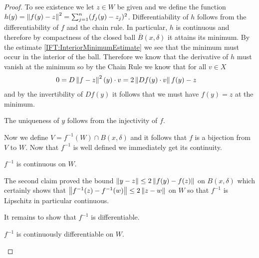 \begin{proof}
To see existence we let $z \in W$ be given and we define the function
$h(y) = \left \lVert f(y) - z \right \rVert^2 = \sum_{j=1}^n (f_j(y) - z_j)^2$.  Differentiability of $h$ follows from the
differentiability of $f$ and the chain rule.  In
particular, $h$ is continuous and therefore by compactness of the
closed ball $\overline{B}(x, \delta)$ it attains its minimum.  By the
estimate \eqref{IFT:InteriorMinimumEstimate} we see that the minimum
must occur in the interior of the ball.  Therefore we know that the
derivative of $h$ must vanish at the minimum so by the Chain Rule we
know that for all $v \in X$
\begin{align*}
0 &=D \left \lVert f - z \right \rVert^2 (y) \cdot v = 2 \left \lVert Df(y)\cdot v \right \rVert{f(y) - z}
\end{align*}
and by the invertibility of $Df(y)$ it follows that we must have $f(y)
= z$ at the minimum.

The uniqueness of $y$ follows from the injectivity of $f$.

Now we define $V = f^{-1}(W) \cap B(x, \delta)$ and it follows that
$f$ is a bijection from $V$ to $W$. Now that $f^{-1}$ is well defined
we immediately get its continuity.  

\begin{clm}$f^{-1}$ is continuous on $W$.
\end{clm}

The second claim proved the bound $\left \lVert y - z \right \rVert \leq 2 \left \lVert f(y) -
  f(z) \right \rVert$ on $B(x, \delta)$ which certainly shows that $\left \lVert f^{-1}(z)
  - f^{-1}(w) \right \rVert \leq 2 \left \lVert z -w \right \rVert$ on $W$ so that $f^{-1}$ is
Lipschitz in particular continuous.

It remains to show that $f^{-1}$ is differentiable.

\begin{clm}$f^{-1}$ is continuously differentiable on $W$.
\end{clm}


\end{proof}
